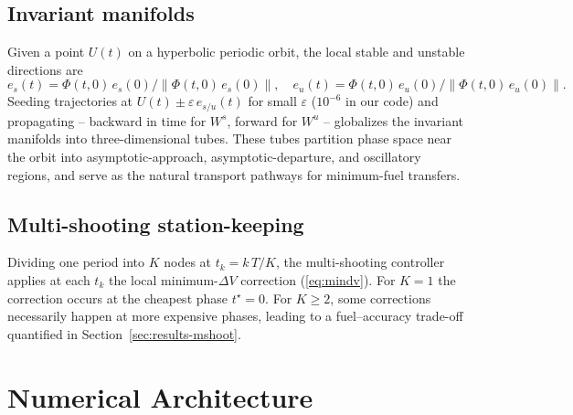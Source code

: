 \documentclass[11pt,a4paper]{article}
\begin{document}
\subsection{Invariant manifolds}
Given a point $U(t)$ on a hyperbolic periodic orbit, the local stable and unstable directions are
\begin{equation}
e_s(t) = \Phi(t,0)\,e_s(0)/\|\Phi(t,0)\,e_s(0)\|,
\quad e_u(t) = \Phi(t,0)\,e_u(0)/\|\Phi(t,0)\,e_u(0)\|.
\end{equation}
Seeding trajectories at $U(t) \pm \varepsilon\,e_{s/u}(t)$ for small $\varepsilon$ ($10^{-6}$ in our code) and propagating -- backward in time for $W^s$, forward for $W^u$ -- globalizes the invariant manifolds into three-dimensional tubes. These tubes partition phase space near the orbit into asymptotic-approach, asymptotic-departure, and oscillatory regions, and serve as the natural transport pathways for minimum-fuel transfers.

\subsection{Multi-shooting station-keeping}
Dividing one period into $K$ nodes at $t_k = k\,T/K$, the multi-shooting controller applies at each $t_k$ the local minimum-$\Delta V$ correction (\ref{eq:mindv}). For $K=1$ the correction occurs at the cheapest phase $t^\star = 0$. For $K \ge 2$, some corrections necessarily happen at more expensive phases, leading to a fuel--accuracy trade-off quantified in Section~\ref{sec:results-mshoot}.

\section{Numerical Architecture}\label{sec:arch}
\end{document}
